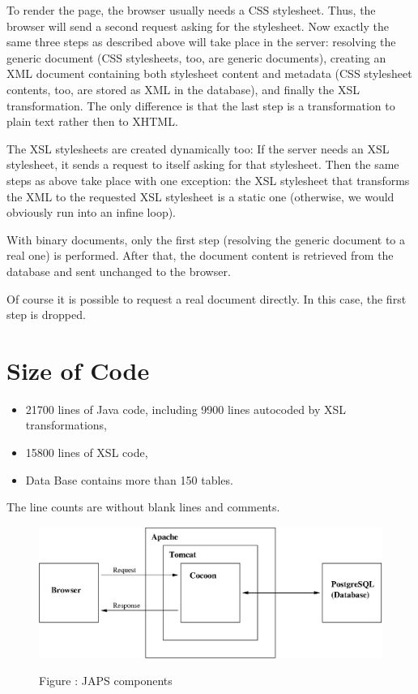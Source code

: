 \documentclass[a4paper,11pt]{article}
\begin{document}
To render the page, the browser usually needs a CSS stylesheet. Thus, the browser will send
a second request asking for the stylesheet. Now exactly the same three steps as described
above will take place in the server: resolving the generic document (CSS stylesheets, too,
are generic documents), creating an XML document containing both stylesheet content and
metadata (CSS stylesheet contents, too, are stored as XML in the database), and finally the
XSL transformation. The only difference is that the last step is a transformation to plain
text rather then to XHTML.

The XSL stylesheets are created dynamically too: If
the server needs an XSL stylesheet, it sends a request to itself asking for that stylesheet.
Then the same steps as above take place with one exception: the XSL stylesheet that
transforms the XML to the requested XSL stylesheet is a static one (otherwise, we would
obviously run into an infine loop).

With binary documents, only the first step (resolving the generic document to a real one) is
performed. After that, the document content is retrieved from the database and sent
unchanged to the browser.

Of course it is possible to request a real document directly. In this case, the first step is
dropped.

\section{Size of Code}

\begin{itemize}
\item 21700 lines of Java code, including 9900 lines autocoded by XSL transformations,
\item 15800 lines of XSL code,
\item Data Base contains more than 150 tables.
\end{itemize}

The line counts are without blank lines and comments.

\pagebreak

\begin{figure}
  \centering
  \includegraphics[width=12cm]{components.eps}

  \vspace{0.5cm}

  \small Figure \thefigure: JAPS components
  \label{fig:components}
\end{figure}
\end{document}
